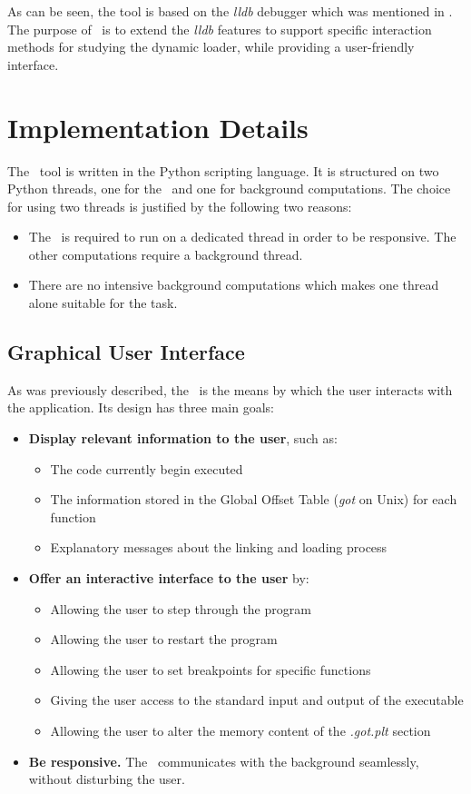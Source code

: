 As can be seen, the tool is based on the \textit{lldb} debugger which was mentioned in . The purpose of \project\ is to extend the \textit{lldb} features to support specific interaction methods for studying the dynamic loader, while providing a user-friendly interface.


\section{Implementation Details}
\label{sec:implem-details}

The \project\ tool is written in the Python scripting language. It is structured on two Python threads, one for the \gui\ and one for background computations. The choice for using two threads is justified by the following two reasons:
\begin{itemize}
\item The \gui\ is required to run on a dedicated thread in order to be responsive. The other computations require a background thread.
\item There are no intensive background computations which makes one thread alone suitable for the task.
\end{itemize}

\subsection{Graphical User Interface}
\label{sub-sec:gui-implem}

As was previously described, the \gui\ is the means by which the user interacts with the application. Its design has three main goals:

\begin{itemize}
\item \textbf{Display relevant information to the user}, such as:
\begin{itemize}
\item The code currently begin executed
\item The information stored in the Global Offset Table (\textit{got} on Unix) for each function
\item Explanatory messages about the linking and loading process
\end{itemize}
\item \textbf{Offer an interactive interface to the user} by:
\begin{itemize}
\item Allowing the user to step through the program
\item Allowing the user to restart the program
\item Allowing the user to set breakpoints for specific functions
\item Giving the user access to the standard input and output of the executable
\item Allowing the user to alter the memory content of the \textit{.got.plt} section
\end{itemize}
\item \textbf{Be responsive.} The \gui\ communicates with the background seamlessly, without disturbing the user.
\end{itemize}

